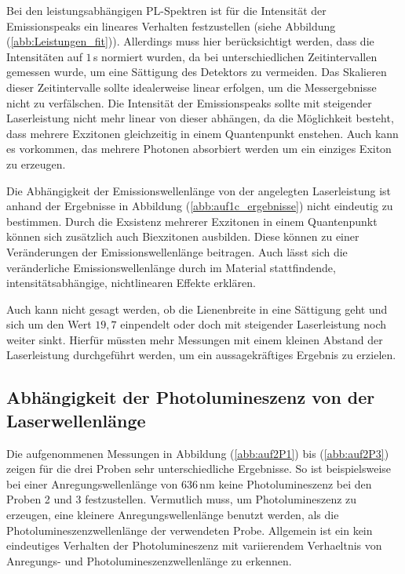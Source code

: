 \bigskip 
Bei den leistungsabh\"{a}ngigen PL-Spektren ist f\"{u}r die Intensit\"{a}t der Emissionspeaks ein lineares Verhalten festzustellen (siehe Abbildung (\ref{abb:Leistungen_fit})).
Allerdings muss hier ber\"{u}cksichtigt werden, dass die Intensit\"{a}ten auf $1 \, $s normiert wurden, da bei unterschiedlichen Zeit{\-}inter{\-}vallen gemessen wurde, um eine S\"{a}ttigung des Detektors zu vermeiden.
Das Skalieren dieser Zeitintervalle sollte idealerweise linear erfolgen, um die Messergebnisse nicht zu verf\"{a}lschen.
Die Intensit\"{a}t der Emissionspeaks sollte mit steigender Laserleistung nicht mehr linear von dieser abh\"{a}ngen, da die M\"{o}glichkeit besteht, dass mehrere Exzitonen gleichzeitig in einem Quantenpunkt enstehen.
Auch kann es vorkommen, das mehrere Photonen absorbiert werden um ein einziges Exiton zu erzeugen.

Die Abh\"{a}ngigkeit der Emissions{\-}wellen{\-}l\"{a}nge von der angelegten Laserleistung ist anhand der Ergebnisse in Abbildung (\ref{abb:auf1c_ergebnisse}) nicht eindeutig zu bestimmen.
Durch die Exsistenz mehrerer Exzitonen in einem Quantenpunkt k\"{o}nnen sich zus\"{a}tzlich auch Biexzitonen ausbilden.
Diese k\"{o}nnen zu einer Veränderungen der Emissionswellenlänge beitragen.
Auch l\"{a}sst sich die ver\"{a}nderliche Emissionswellenlänge durch im Material stattfindende, intensitätsabhängige, nichtlinearen Effekte erklären.

Auch kann nicht gesagt werden, ob die Lienenbreite in eine S\"{a}ttigung geht und sich um den Wert $19,7$ einpendelt oder doch mit steigender Laserleistung noch weiter sinkt.
Hierf\"{u}r m\"{u}ssten mehr Messungen mit einem kleinen Abstand der Laserleistung durchgef\"{u}hrt werden, um ein aussagekr\"{a}ftiges Ergebnis zu erzielen.

\subsection{Abhängigkeit der Photolumineszenz von der Laserwellenlänge}
Die aufgenommenen Messungen in Abbildung (\ref{abb:auf2P1}) bis (\ref{abb:auf2P3}) zeigen f\"{u}r die drei Proben sehr unterschiedliche Ergebnisse.
So ist beispielsweise bei einer Anregungswellenl\"{a}nge von $636 \, \text{nm}$ keine Photolumineszenz bei den Proben 2 und 3 festzustellen.
Vermutlich muss, um Photolumineszenz zu erzeugen, eine kleinere Anregungswellenl\"{a}nge benutzt werden, als die Photolumineszenzwellenl\"{a}nge der verwendeten Probe.
Allgemein ist ein kein eindeutiges Verhalten der Photolumineszenz mit variierendem Verhaeltnis von Anregungs- und Photolumineszenzwellenl\"{a}nge zu erkennen.

